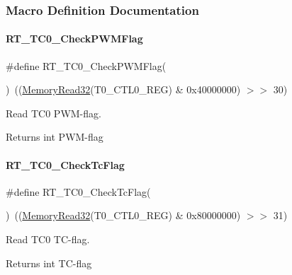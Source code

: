 \subsubsection{Macro Definition Documentation}
\mbox{\label{a00041_ae20de59a971c4aa0a50a724ac08fb19e}} 
\paragraph{\texorpdfstring{R\+T\+\_\+\+T\+C0\+\_\+\+Check\+P\+W\+M\+Flag}{RT\_TC0\_CheckPWMFlag}}
{\footnotesize\ttfamily \#define R\+T\+\_\+\+T\+C0\+\_\+\+Check\+P\+W\+M\+Flag(\begin{DoxyParamCaption}{ }\end{DoxyParamCaption})~((\mbox{\hyperlink{a00020_a706b02571285f92589fbb0b964d7d0bb}{Memory\+Read32}}(T0\+\_\+\+C\+T\+L0\+\_\+\+R\+EG) \& 0x40000000) $>$$>$ 30)}



Read T\+C0 P\+W\+M-\/flag. 

\begin{DoxyReturn}{Returns}
int P\+W\+M-\/flag 
\end{DoxyReturn}
\mbox{\label{a00041_a41989522dd60679c7c86268b68363a5c}} 
\paragraph{\texorpdfstring{R\+T\+\_\+\+T\+C0\+\_\+\+Check\+Tc\+Flag}{RT\_TC0\_CheckTcFlag}}
{\footnotesize\ttfamily \#define R\+T\+\_\+\+T\+C0\+\_\+\+Check\+Tc\+Flag(\begin{DoxyParamCaption}{ }\end{DoxyParamCaption})~((\mbox{\hyperlink{a00020_a706b02571285f92589fbb0b964d7d0bb}{Memory\+Read32}}(T0\+\_\+\+C\+T\+L0\+\_\+\+R\+EG) \& 0x80000000) $>$$>$ 31)}



Read T\+C0 T\+C-\/flag. 

\begin{DoxyReturn}{Returns}
int T\+C-\/flag 
\end{DoxyReturn}
\mbox{\label{a00041_a455c100511141b1243e8ee7f756e6553}} 
